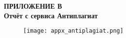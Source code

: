 


\newpage

\begin{center}
    \textbf{
    \MakeUppercase{Приложение В}\\
    Отчёт с сервиса Антиплагиат}
\end{center}

\begin{figure}[H]
    \centering
    \texttt{[image: appx\_antiplagiat.png]}
    \label{fig:appendix:antiplagiat}
\end{figure}